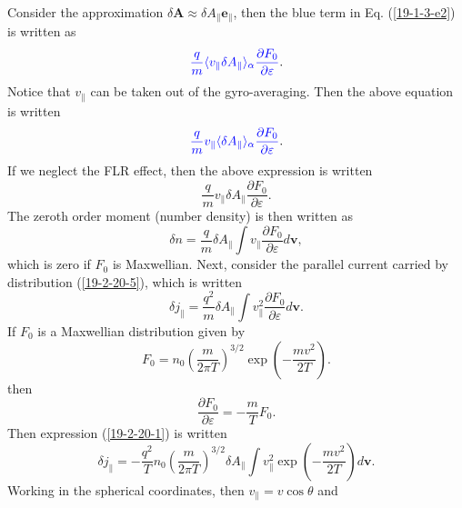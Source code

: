 \documentclass{article}
\newcommand{\tmcolor}[2]{{\color{#1}{#2}}}
\begin{document}
Consider the approximation $\delta \mathbf{A} \approx \delta A_{\parallel}
\mathbf{e}_{\parallel}$, then the blue term in Eq. (\ref{19-1-3-e2}) is
written as
\begin{equation}
  \tmcolor{blue}{\frac{q}{m} \langle v_{\parallel} \delta A_{\parallel}
  \rangle_{\alpha} \frac{\partial F_0}{\partial \varepsilon}} .
\end{equation}
Notice that $v_{\parallel}$ can be taken out of the gyro-averaging. Then the
above equation is written
\begin{equation}
  \tmcolor{blue}{\frac{q}{m} v_{\parallel} \langle \delta A_{\parallel}
  \rangle_{\alpha} \frac{\partial F_0}{\partial \varepsilon}} .
\end{equation}
If we neglect the FLR effect, then the above expression is written
\begin{equation}
  \label{19-2-20-5} \frac{q}{m} v_{\parallel} \delta A_{\parallel}
  \frac{\partial F_0}{\partial \varepsilon} .
\end{equation}
The zeroth order moment (number density) is then written as
\begin{equation}
  \delta n = \frac{q}{m} \delta A_{\parallel} \int v_{\parallel}
  \frac{\partial F_0}{\partial \varepsilon} d\mathbf{v},
\end{equation}
which is zero if $F_0$ is Maxwellian. Next, consider the parallel current
carried by distribution (\ref{19-2-20-5}), which is written
\begin{equation}
  \label{19-2-20-1} \delta j_{\parallel} = \frac{q^2}{m} \delta A_{\parallel}
  \int v_{\parallel}^2 \frac{\partial F_0}{\partial \varepsilon} d\mathbf{v}.
\end{equation}
If $F_0$ is a Maxwellian distribution given by
\begin{equation}
  F_0 = n_0 \left( \frac{m}{2 \pi T} \right)^{3 / 2} \exp \left( - \frac{m
  v^2}{2 T} \right) .
\end{equation}
then
\begin{equation}
  \frac{\partial F_0}{\partial \varepsilon} = - \frac{m}{T} F_0 .
\end{equation}
Then expression (\ref{19-2-20-1}) is written
\begin{equation}
  \label{19-2-20-4} \delta j_{\parallel} = - \frac{q^2}{T} n_0 \left(
  \frac{m}{2 \pi T} \right)^{3 / 2} \delta A_{\parallel} \int v_{\parallel}^2
  \exp \left( - \frac{m v^2}{2 T} \right) d\mathbf{v}.
\end{equation}
Working in the spherical coordinates, then $v_{\parallel} = v \cos \theta$ and
\end{document}
